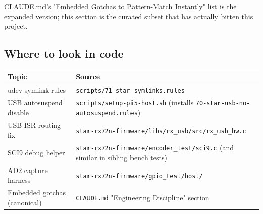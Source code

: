 CLAUDE.md's "Embedded Gotchas to Pattern-Match Instantly" list is
the expanded version; this section is the curated subset that has
actually bitten this project.

\subsection{Where to look in code}

\begin{center}
\begin{tabular}{|p{5.5cm}|p{8.5cm}|}
\hline
\textbf{Topic}                                & \textbf{Source}                                                                          \\
\hline
udev symlink rules                            & \texttt{scripts/71-star-symlinks.rules}                                                  \\
USB autosuspend disable                       & \texttt{scripts/setup-pi5-host.sh} (installs \texttt{70-star-usb-no-autosuspend.rules}) \\
USB ISR routing fix                           & \texttt{star-rx72n-firmware/libs/rx\_usb/src/rx\_usb\_hw.c}                              \\
SCI9 debug helper                             & \texttt{star-rx72n-firmware/encoder\_test/sci9.c} (and similar in sibling bench tests)   \\
AD2 capture harness                           & \texttt{star-rx72n-firmware/gpio\_test/host/}                                            \\
Embedded gotchas (canonical)                  & \texttt{CLAUDE.md} "Engineering Discipline" section                                       \\
\hline
\end{tabular}
\end{center}
